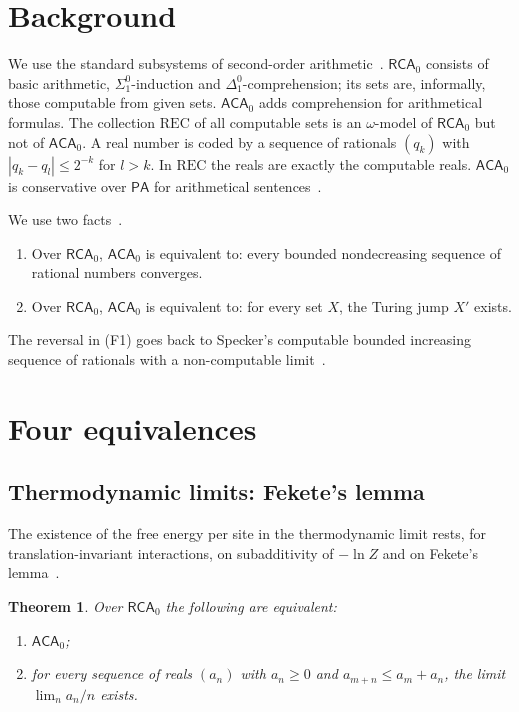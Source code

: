 \documentclass[11pt]{article}
\newtheorem{theorem}{Theorem}
\theoremstyle{definition}\newtheorem{definition}{Definition}[section]
\theoremstyle{remark}\newtheorem*{remark}{Remark}
\newcommand{\RCA}{\mathsf{RCA}_0}
\newcommand{\ACA}{\mathsf{ACA}_0}
\newcommand{\PA}{\mathsf{PA}}
\newcommand{\REC}{\mathrm{REC}}
\begin{document}
\section{Background}
\label{sec:background}

We use the standard subsystems of second-order arithmetic~\cite{Simpson}. $\RCA$ consists of basic arithmetic,
$\Sigma^0_1$-induction and $\Delta^0_1$-comprehension; its sets are, informally, those computable from given sets. $\ACA$ adds
comprehension for arithmetical formulas. The collection $\REC$ of all computable sets is an $\omega$-model of $\RCA$ but not
of $\ACA$. A real number is coded by a sequence of rationals $(q_k)$ with $|q_k-q_l|\le2^{-k}$ for $l>k$. In $\REC$ the reals are
exactly the computable reals. $\ACA$ is conservative over $\PA$ for arithmetical sentences~\cite{Simpson}.

We use two facts~\cite[\S\S III.1--III.2]{Simpson}.
\begin{enumerate}
\item[(F1)] Over $\RCA$, $\ACA$ is equivalent to: every bounded nondecreasing sequence of rational numbers converges.
\item[(F2)] Over $\RCA$, $\ACA$ is equivalent to: for every set $X$, the Turing jump $X'$ exists.
\end{enumerate}
The reversal in (F1) goes back to Specker's computable bounded increasing sequence of rationals with a non-computable
limit~\cite{Specker}.

\section{Four equivalences}
\label{sec:equivalences}

\subsection{Thermodynamic limits: Fekete's lemma}

The existence of the free energy per site in the thermodynamic limit rests, for translation-invariant interactions, on
subadditivity of $-\ln Z$ and on Fekete's lemma~\cite{Fekete,Ruelle}.

\begin{theorem}
\label{thm:fekete}
Over $\RCA$ the following are equivalent:
\begin{enumerate}
\item[(i)] $\ACA$;
\item[(ii)] for every sequence of reals $(a_n)$ with $a_n\ge0$ and $a_{m+n}\le a_m+a_n$, the limit $\lim_na_n/n$ exists.
\end{enumerate}
\end{theorem}
\end{document}
